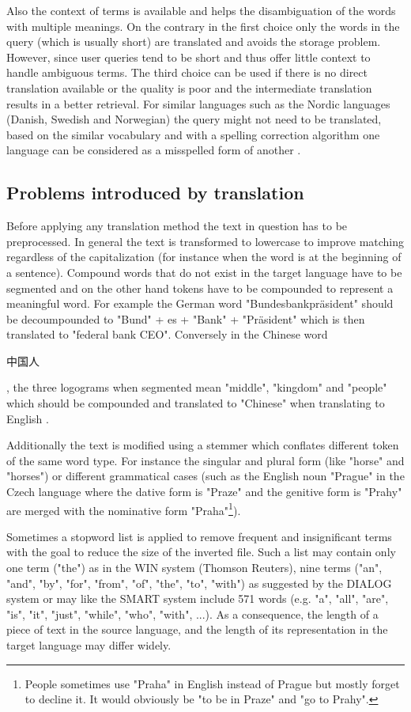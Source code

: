 \documentclass[journal]{IEEEtran}
\begin{document}
Also the context of terms is available and helps the disambiguation of the words with multiple meanings.
On the contrary in the first choice only the words in the query (which is usually short) are translated and avoids the storage problem.
However, since user queries tend to be short and thus offer little context to handle ambiguous terms.
The third choice can be used if there is no direct translation available or the quality is poor and the intermediate translation results in a better retrieval.
For similar languages such as the Nordic languages (Danish, Swedish and Norwegian) the query might not need to be translated, based on the similar vocabulary and with a spelling correction algorithm one language can be considered as a misspelled form of another \cite{peters12}.

\subsection{Problems introduced by translation}
\label{sec:problems}
Before applying any translation method the text in question has to be preprocessed.
In general the text is transformed to lowercase to improve matching regardless of the capitalization (for instance when the word is at the beginning of a sentence).
Compound words that do not exist in the target language have to be segmented and on the other hand tokens have to be compounded to represent a meaningful word.
For example the German word "Bundesbankpr\"{a}sident" should be decoumpounded to "Bund" + es + "Bank" + "Pr\"{a}sident" which is then translated to "federal bank CEO".
Conversely in the Chinese word \begin{CJK}{UTF8}{gbsn}中国人\end{CJK}, the three logograms when segmented mean "middle", "kingdom" and "people" which should be compounded and translated to "Chinese" when translating to English \cite{ir13}.

Additionally the text is modified using a stemmer which conflates different token of the same word type.
For instance the singular and plural form (like "horse" and "horses") or different grammatical cases (such as the English noun "Prague" in the Czech language where the dative form is "Praze" and the genitive form is "Prahy" are merged with the nominative form "Praha"\footnote{People sometimes use "Praha" in English instead of Prague but mostly forget to decline it.
It would obviously be "to be in Praze" and "go to Prahy".}).

Sometimes a stopword list is applied to remove frequent and insignificant terms with the goal to reduce the size of the inverted file.
Such a list may contain only one term ("the") as in the WIN system (Thomson Reuters), nine terms ("an", "and", "by", "for", "from", "of", "the", "to", "with") as suggested by the DIALOG system or may like the SMART system include 571 words (e.g. "a", "all", "are", "is", "it", "just", "while", "who", "with", ...).
As a consequence, the length of a piece of text in the source language, and the length of its representation in the target language may differ widely.
\end{document}

